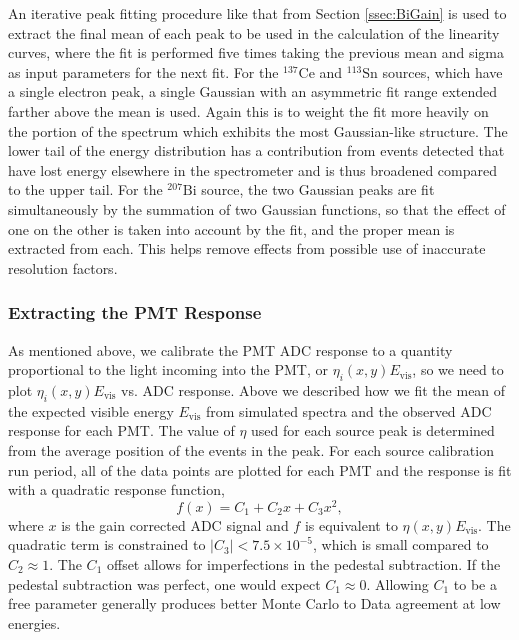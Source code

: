 An iterative peak fitting procedure like that from Section \ref{ssec:BiGain} is used to extract the final mean
of each peak to be used in the calculation of the linearity curves,
where the fit is performed five times taking the previous mean and sigma as input parameters
for the next fit. For the  $^{137}\mathrm{Ce}$ and $^{113}\mathrm{Sn}$ sources, which have a single
electron peak, a single Gaussian with an asymmetric fit range extended farther above the mean is used. Again this is to
weight the fit more heavily on the portion of the spectrum which exhibits the most Gaussian-like structure. The
lower tail of the energy distribution has a contribution from events detected that have lost energy elsewhere
in the spectrometer and is thus broadened compared to the upper tail. For the $^{207}\mathrm{Bi}$ source,
the two Gaussian peaks are fit simultaneously by
the summation of two Gaussian functions, so that the effect of one on the other is taken into account by the fit, and
the proper mean is extracted from each. This helps remove effects from possible use of inaccurate
resolution factors. %

\subsubsection{Extracting the PMT Response}

As mentioned above, we calibrate the PMT ADC response to a quantity proportional to the light incoming into
the PMT, or $\eta_i(x,y)E_{\mathrm{vis}}$, so we need to plot $\eta_i(x,y)E_{\mathrm{vis}}$ vs. ADC response.
Above we described how we fit the mean of the expected visible energy
$E_{\mathrm{vis}}$ from simulated spectra and the observed ADC response for each PMT.
The value of $\eta$ used for each source peak is determined from the average position of the events in the peak.
For each source calibration run period, all of the data points are plotted for each PMT and the response
is fit with a quadratic response function,
%
\begin{equation} \label{eq:linCurveParam}
  f(x) = C_1 + C_2x+ C_3x^2,
\end{equation}
%
where $x$ is the gain corrected ADC signal and $f$ is equivalent to $\eta(x,y)E_{\mathrm{vis}}$. The quadratic term
is constrained to $|C_3|<7.5\times10^{-5}$, which is small compared to $C_2\approx1$. The $C_1$ offset allows
for imperfections in the pedestal subtraction. If the pedestal subtraction was perfect, one would expect
$C_1\approx0$. Allowing $C_1$ to be a free parameter generally produces better Monte Carlo to Data agreement
at low energies.

